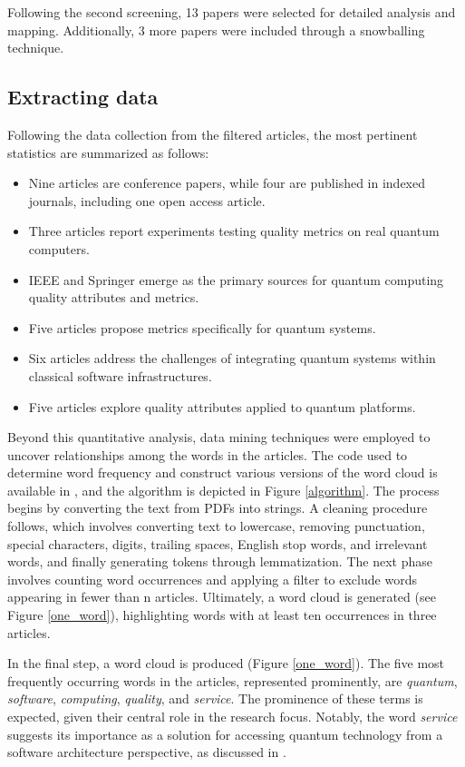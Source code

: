 Following the second screening, 13 papers were selected for detailed analysis and mapping. Additionally, 3 more papers were included through a snowballing technique.

\subsection{Extracting data} 
\label{summary_of_findings}

Following the data collection from the filtered articles, the most pertinent statistics are summarized as follows:

\begin{itemize}
  \item Nine articles are conference papers, while four are published in indexed journals, including one open access article.
  \item Three articles report experiments testing quality metrics on real quantum computers.
  \item IEEE and Springer emerge as the primary sources for quantum computing quality attributes and metrics.
  \item Five articles propose metrics specifically for quantum systems.
  \item Six articles address the challenges of integrating quantum systems within classical software infrastructures.
  \item Five articles explore quality attributes applied to quantum platforms.
\end{itemize}

Beyond this quantitative analysis, data mining techniques were employed to uncover relationships among the words in the articles. The code used to determine word frequency and construct various versions of the word cloud is available in \cite{xthecapxMapping}, and the algorithm is depicted in Figure \ref{algorithm}. The process begins by converting the text from PDFs into strings. A cleaning procedure follows, which involves converting text to lowercase, removing punctuation, special characters, digits, trailing spaces, English stop words, and irrelevant words, and finally generating tokens through lemmatization. The next phase involves counting word occurrences and applying a filter to exclude words appearing in fewer than n articles. Ultimately, a word cloud is generated (see Figure \ref{one_word}), highlighting words with at least ten occurrences in three articles.

In the final step, a word cloud is produced (Figure \ref{one_word}). The five most frequently occurring words in the articles, represented prominently, are \emph{quantum}, \emph{software}, \emph{computing}, \emph{quality}, and \emph{service}. The prominence of these terms is expected, given their central role in the research focus. Notably, the word \emph{service} suggests its importance as a solution for accessing quantum technology from a software architecture perspective, as discussed in \cite{Alonso_Murillo_2023, Moguel2022, Vietz2021_QuantumSoftwareEngineeringChallenges}.

